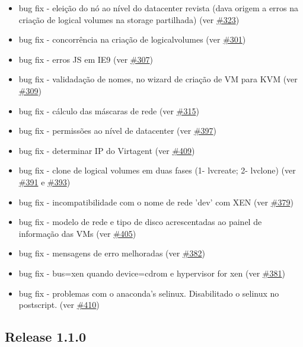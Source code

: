 \begin{itemize}
	\item bug fix - eleição do nó ao nível do datacenter revista (dava origem a erros na criação de logical volumes na storage partilhada) (ver \href{https://srcmaster.eurotux.com/pm/p/etva/ticket/323}{\#323})
	\item bug fix - concorrência na criação de logicalvolumes (ver \href{https://srcmaster.eurotux.com/pm/p/etva/ticket/301}{\#301})
	\item bug fix - erros JS em IE9 (ver \href{https://srcmaster.eurotux.com/pm/p/etva/ticket/307}{\#307})
	\item bug fix - validadação de nomes, no wizard de criação de VM para KVM (ver \href{https://srcmaster.eurotux.com/pm/p/etva/ticket/309}{\#309})
	\item bug fix - cálculo das máscaras de rede (ver \href{https://srcmaster.eurotux.com/pm/p/etva/ticket/315}{\#315})
	\item bug fix - permissões ao nível de datacenter (ver \href{https://srcmaster.eurotux.com/pm/p/etva/ticket/397}{\#397})
	\item bug fix - determinar IP do Virtagent (ver \href{https://srcmaster.eurotux.com/pm/p/etva/ticket/409}{\#409})
	\item bug fix - clone de logical volumes em duas fases (1- lvcreate; 2- lvclone) (ver \href{https://srcmaster.eurotux.com/pm/p/etva/ticket/391}{\#391} e \href{https://srcmaster.eurotux.com/pm/p/etva/ticket/393}{\#393})
	\item bug fix - incompatibilidade com o nome de rede 'dev' com XEN (ver \href{https://srcmaster.eurotux.com/pm/p/etva/ticket/379}{\#379})
	\item bug fix - modelo de rede e tipo de disco acrescentadas ao painel de informação das VMs (ver \href{https://srcmaster.eurotux.com/pm/p/etva/ticket/405}{\#405})
	\item bug fix - mensagens de erro melhoradas (ver \href{https://srcmaster.eurotux.com/pm/p/etva/ticket/382}{\#382})
	\item bug fix - bus=xen quando device=cdrom e hypervisor for xen (ver \href{https://srcmaster.eurotux.com/pm/p/etva/ticket/381}{\#381})
	\item bug fix - problemas com o anaconda's selinux. Disabilitado o selinux no postscript. (ver \href{https://srcmaster.eurotux.com/pm/p/etva/ticket/410}{\#410})
\end{itemize}

\subsection{Release 1.1.0}

